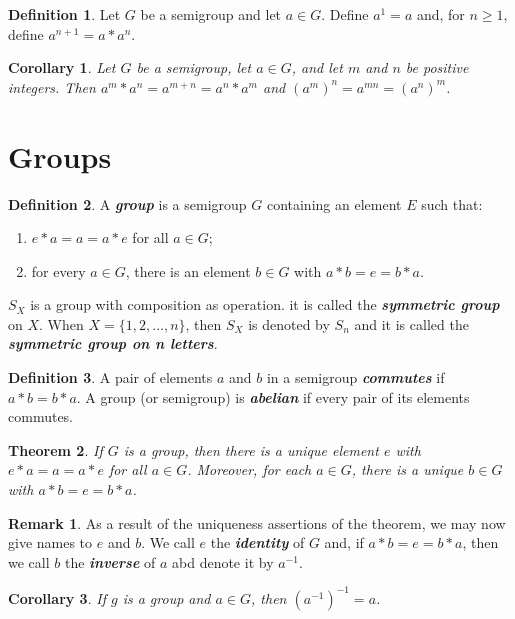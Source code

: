\documentclass[10pt]{report}
\newtheorem{theorem}{Theorem}[chapter]
\newtheorem{corollary}[theorem]{Corollary}
\theoremstyle{definition}
\newtheorem*{definition}{Definition}
\newtheorem*{remark}{Remark}
\newcommand{\term}[1]{\textbf{\textit{#1}}}
\begin{document}
\begin{definition}
	Let $G$ be a semigroup and let $a\in G$. Define $a^1=a$ and, for $n\geq1$, define $a^{n+1}=a\ast a^n$.
\end{definition}

\begin{corollary}
	Let $G$ be a semigroup, let $a\in G$, and let $m$ and $n$ be positive integers. Then $a^m\ast a^n=a^{m+n}=a^n\ast a^m$ and $(a^m)^n=a^{mn}=(a^n)^m$.
\end{corollary}


\section{Groups}
\begin{definition}
	A \term{group} is a semigroup $G$ containing an element $E$ such that:
	\begin{enumerate}
		\item $e\ast a=a=a\ast e$ for all $a\in G$;
		\item for every $a\in G$, there is an element $b\in G$ with $a\ast b=e=b\ast a$.
	\end{enumerate}
	\par
	$S_X$ is a group with composition as operation. it is called the \term{symmetric group} on $X$. When $X=\{1, 2, \dots, n\}$,
	then $S_X$ is denoted by $S_n$ and it is called the \term{symmetric group on n letters}.
\end{definition}

\begin{definition}
	A pair of elements $a$ and $b$ in a semigroup \term{commutes} if $a\ast b=b\ast a$. A group (or semigroup) is \term{abelian} if every pair of its elements commutes.
\end{definition}

\begin{theorem}
	If $G$ is a group, then there is a unique element $e$ with $e\ast a=a=a\ast e$ for all $a\in G$.
	Moreover, for each $a\in G$, there is a unique $b\in G$ with $a\ast b=e=b\ast a$.
\end{theorem}

\begin{remark}
	As a result of the uniqueness assertions of the theorem, we may now give names to $e$ and $b$. We call $e$ the \term{identity} of $G$ and,
	if $a\ast b=e=b\ast a$, then we call $b$ the \term{inverse} of $a$ abd denote it by $a^{-1}$.
\end{remark}

\begin{corollary}
	If $g$ is a group and $a\in G$, then $(a^{-1})^{-1}=a$.
\end{corollary}
\end{document}

